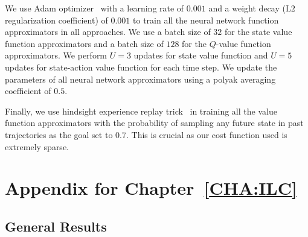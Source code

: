We use Adam optimizer~\cite{DBLP:journals/corr/KingmaB14} with a
learning rate of $0.001$ and a weight decay (L$2$ regularization
coefficient) of $0.001$ to train all the neural network function
approximators in all approaches. We use a batch size of $32$ for the
state value function approximators and a batch size of $128$ for the
$Q$-value function approximators. We perform $U = 3$ updates for state
value function and $U = 5$ updates for state-action value function for
each time step. We update the parameters of all neural network
approximators using a polyak averaging coefficient of $0.5$.


Finally, we use hindsight experience replay
trick~\cite{DBLP:conf/nips/AndrychowiczCRS17} in training all the
value function approximators with the probability of sampling any
future state in past trajectories as the goal set to $0.7$. This is
crucial as our cost function used is extremely sparse.

\clearpage
\newpage
\section{Appendix for Chapter~\ref{CHA:ILC}}
\label{sec:append-chapt-ilc}

\subsection{General Results}
\label{sec:general-results-1}

